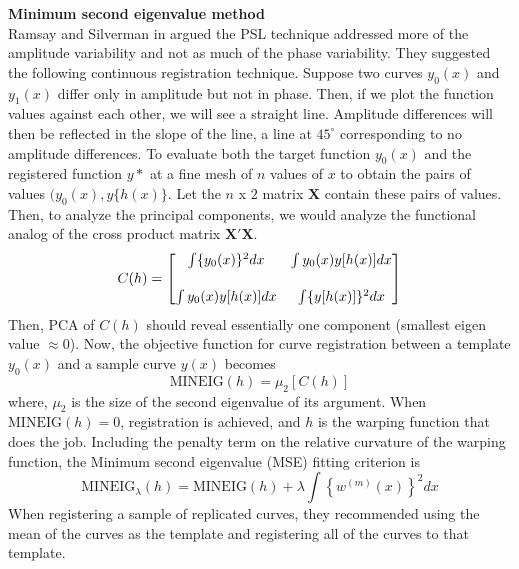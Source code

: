 \noindent
{\bf{Minimum second eigenvalue method}} \\
Ramsay and Silverman in \cite{Ramsay_2006_Functional} argued the PSL technique addressed more of the amplitude variability and not as much of the phase variability. They suggested the following continuous registration technique. Suppose two curves $y_0(x)$ and $y_1(x)$ differ only in amplitude but not in phase. Then, if we plot the function values against each other, we will see a straight line. Amplitude
differences will then be reflected in the slope of the line, a line at $45^{\circ}$ corresponding to no amplitude differences. To evaluate both the target function $y_0(x)$ and the registered function 
$y*$ at a fine mesh of $n$ values of $x$ to obtain the pairs of values $(y_0(x), y\{h(x) \}$. Let the $n$ x $2$ matrix $\mathbf{X}$ contain these pairs of values. Then, to analyze the principal components, we would analyze the functional analog of the cross product matrix $\mathbf{X'X}$. 
\begin{equation}
C(h) = 
\begin{bmatrix}
\int \{y_0(x) \}^2dx & \int y_0(x) y[h(x)]dx \vspace{0.5cm} \\ 
\int y_0(x) y[h(x)]dx & \int \{y[h(x)]\}^2dx
\end{bmatrix}
\end{equation}
Then, PCA of $C(h)$ should reveal essentially one component (smallest eigen value $\approx 0$). Now, the objective function for curve registration between a template $y_0(x)$ and a sample curve $y(x)$ becomes
\[ \text{MINEIG}(h) = \mu_2[C(h)]\]
where, $\mu_2$ is the size of the second eigenvalue of its argument. When $\text{MINEIG}(h)=0$, registration is achieved, and $h$ is the warping function that does the job. Including the penalty term on the relative curvature of the warping function, the Minimum second eigenvalue (MSE) fitting criterion is
\begin{equation}
\text{MINEIG}_{\lambda}(h) = \text{MINEIG}(h) + \lambda \displaystyle \int \left\{ w^{(m)}(x) \right\}^2 dx
\end{equation}
When registering a sample of replicated curves, they \cite{Ramsay_etal_2009_Functional_R} recommended using the mean of the curves as the template and registering all of the curves to that template. \\

